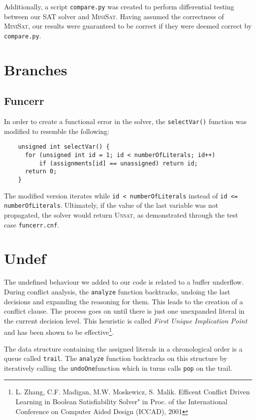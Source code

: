 Additionally, a script \texttt{compare.py} was created to perform differential testing between our SAT solver and \textsc{MiniSat}. Having assumed the correctness of \textsc{MiniSat}, our results were guaranteed to be correct if they were deemed correct by \texttt{compare.py}.
    
\section{Branches}
\subsection{Funcerr}
In order to create a functional error in the solver, the \texttt{selectVar()} function was modified to resemble the following:
    \begin{lstlisting}
    unsigned int selectVar() {  
      for (unsigned int id = 1; id < numberOfLiterals; id++) 
          if (assignments[id] == unassigned) return id;
      return 0;
  	}
 	\end{lstlisting}

The modified version iterates while \texttt{id < numberOfLiterals} instead of \texttt{id <= numberOfLiterals}. Ultimately, if the value of the last variable was not propagated, the solver would return \textsc{Unsat}, as demonstrated through the test case \texttt{funcerr.cnf}.
    
\section{Undef}
The undefined behaviour we added to our code is related to a buffer underflow. During conflict analysis, the \texttt{analyze} function backtracks, undoing the last decisions and expanding the reasoning for them. This leads to the creation of a conflict clause. The process goes on until there is just one unexpanded literal in the current decision level. This heuristic is called \textit{First Unique Implication Point} and has been shown to be effective\footnote{L. Zhang, C.F. Madigan, M.W. Moskewicz, S. Malik. Efficent Conflict Driven Learning in Boolean Satisfiability Solver" in Proc. of the International Conference on Computer Aided Design (ICCAD), 2001}.

The data structure containing the assigned literals in a chronological order is a queue called \texttt{trail}. The \texttt{analyze} function backtracks on this structure by iteratively calling the \texttt{undoOne}function which in turns calls \texttt{pop} on the trail.

